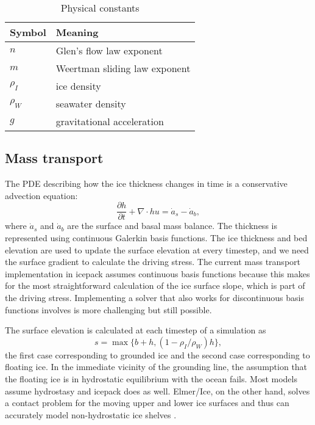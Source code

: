 \documentclass{article}
\theoremstyle{definition}
\theoremstyle{plain}
\begin{document}
\begin{table}[h]
    \begin{tabular}{l|l}
        Symbol & Meaning \\
        \hline
        $n$ & Glen's flow law exponent \\
        $m$ & Weertman sliding law exponent \\
        $\rho_I$ & ice density \\
        $\rho_W$ & seawater density \\
        $g$ & gravitational acceleration
    \end{tabular}
    \caption{Physical constants}
\end{table}


\subsection{Mass transport}

The PDE describing how the ice thickness changes in time is a conservative advection equation:
\begin{equation}
    \frac{\partial h}{\partial t} + \nabla\cdot hu = \dot a_s - \dot a_b,
\end{equation}
where $\dot a_s$ and $\dot a_b$ are the surface and basal mass balance.
The thickness is represented using continuous Galerkin basis functions.
The ice thickness and bed elevation are used to update the surface elevation at every timestep, and we need the surface gradient to calculate the driving stress.
The current mass transport implementation in icepack assumes continuous basis functions because this makes for the most straightforward calculation of the ice surface slope, which is part of the driving stress.
Implementing a solver that also works for discontinuous basis functions involves is more challenging but still possible.

The surface elevation is calculated at each timestep of a simulation as
\begin{equation}
    s = \max\{b + h, (1 - \rho_I / \rho_W)h\},
\end{equation}
the first case corresponding to grounded ice and the second case corresponding to floating ice.
In the immediate vicinity of the grounding line, the assumption that the floating ice is in hydrostatic equilibrium with the ocean fails.
Most models assume hydrostasy and icepack does as well.
Elmer/Ice, on the other hand, solves a contact problem for the moving upper and lower ice surfaces and thus can accurately model non-hydrostatic ice shelves \citep{gagliardini2013capabilities}.
\end{document}
